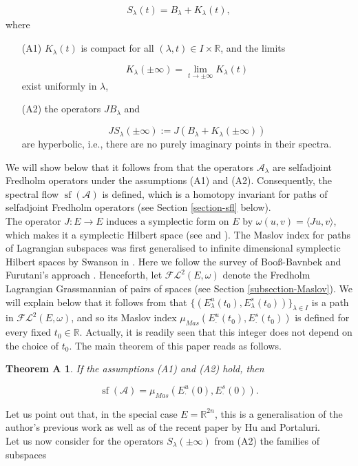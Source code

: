 \documentclass[a4paper,10pt]{article}
\newtheorem*{theoremA}{Theorem A}
\DeclareMathOperator{\sfl}{sf}
\begin{document}
\begin{align}\label{form}
S_\lambda(t)=B_\lambda+K_\lambda(t),
\end{align}
where

\begin{enumerate}
\item[(A1)] $K_\lambda(t)$ is compact for all $(\lambda,t)\in I\times\mathbb{R}$, and the limits

\[K_\lambda(\pm\infty)=\lim_{t\rightarrow\pm\infty}K_\lambda(t)\]
exist uniformly in $\lambda$,
\item[(A2)] the operators $JB_\lambda$ and

\[JS_\lambda(\pm\infty):=J(B_\lambda+K_\lambda(\pm\infty))\]
are hyperbolic, i.e., there are no purely imaginary points in their spectra.
\end{enumerate} 
We will show below that it follows from \cite{AlbertoMorseHilbert} that the operators $\mathcal{A}_\lambda$ are selfadjoint Fredholm operators under the assumptions (A1) and (A2). Consequently, the spectral flow $\sfl(\mathcal{A})$ is defined, which is a homotopy invariant for paths of selfadjoint Fredholm operators (see Section \ref{section-sfl} below).\\
The operator $J:E\rightarrow E$ induces a symplectic form on $E$ by $\omega(u,v)=\langle Ju,v\rangle$, which makes it a symplectic Hilbert space (see \cite{BoossZhu} and \cite{NicolaescuII}). The Maslov index for paths of Lagrangian subspaces was first generalised to infinite dimensional symplectic Hilbert spaces by Swanson in \cite{Swanson}. Here we follow the survey \cite{Furutani} of Boo{\ss}-Bavnbek and Furutani's approach \cite{BoossFurutani}. Henceforth, let $\mathcal{FL}^2(E,\omega)$ denote the Fredholm Lagrangian Grassmannian of pairs of spaces (see Section \ref{subsection-Maslov}). We will explain below that it follows from \cite{AlbertoODE} that $\{(E^u_\lambda(t_0),E^s_\lambda(t_0))\}_{\lambda\in I}$ is a path in $\mathcal{FL}^2(E,\omega)$, and so its Maslov index $\mu_{Mas}(E^u_\cdot(t_0),E^s_\cdot(t_0))$ is defined for every fixed $t_0\in\mathbb{R}$. Actually, it is readily seen that this integer does not depend on the choice of $t_0$. The main theorem of this paper reads as follows.   


\begin{theoremA}
If the assumptions (A1) and (A2) hold, then

\[\sfl(\mathcal{A})=\mu_{Mas}(E^u_\cdot(0),E^s_\cdot(0)).\]
\end{theoremA}
\noindent
Let us point out that, in the special case $E=\mathbb{R}^{2n}$, this is a generalisation of the author's previous work \cite{WaterstraatHomoclinics} as well as of the recent paper \cite{Hu} by Hu and Portaluri.\\
Let us now consider for the operators $S_\lambda(\pm\infty)$ from (A2) the families of subspaces 
\end{document}
